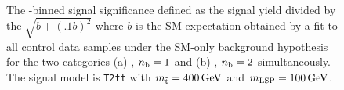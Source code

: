 \begin{figure}[t!]
  \begin{center}
     \\
    \caption{\label{fig:t2cc-sig-400_100} The \scalht-binned 
      signal significance defined as the signal yield 
      divided by the $\sqrt{b+(.1b)^2}$ where $b$ is the
      SM expectation obtained by a fit to all 
      control data samples under the SM-only background 
      hypothesis for the two categories (a) \njethigh, $n_{\text{b}} = 1$ and (b) 
      \njethigh, $n_{\text{b}} = 2$ simultaneously. 
      The signal model is \texttt{T2tt} with 
      $m_{\tilde{\rm t}} = 400\,\text{Ge\hspace{-.08em}V}$ and $m_{\text{LSP}} = 100\,\text{Ge\hspace{-.08em}V}$.} 
  \end{center}
\end{figure}

